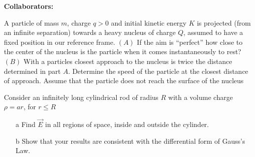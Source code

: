 \documentclass[11pt,letterpaper,boxed]{hmcpset}
\begin{document}
\noindent\textbf{Collaborators:} 


\begin{problem}
A particle of mass $m$, charge $q > 0$ and initial kinetic energy $K$ is projected (from an infinite separation) towards a heavy nucleus of charge $Q$, assumed to have a fixed position in our reference frame. $(A)$ If the aim is ``perfect'' how close to the center of the nucleus is the particle when it comes instantaneously to rest? $(B)$ With a particles closest approach to the nucleus is twice the distance determined in part $A$. Determine the speed of the particle at the closest distance of approach. Assume that the particle does not reach the surface of the nucleus
\end{problem}

\begin{solution}
\vfill
\end{solution}
\newpage

\begin{problem}[2.]
Consider an infinitely long cylindrical rod of radius $R$ with a volume charge $\rho = a r $, for $r \leq R$ 
\begin{enumerate}
\item[a] Find $\vec{E}$ in all regions of space, inside and outside the cylinder. 
\item[b] Show that your results are consistent with the differential form of Gauss's Law. 
\end{enumerate}

\end{problem}

\begin{solution}
\vfill
\end{solution}
\newpage
\end{document}
